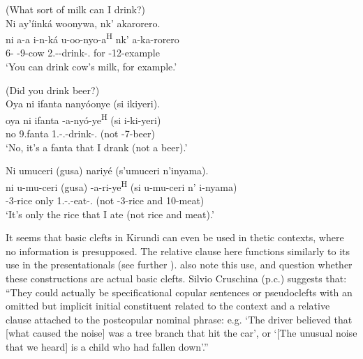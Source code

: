 \documentclass[output=paper]{langscibook}
\begin{document}
\z

\ea
\label{bkm:Ref79134504}
(What sort of milk can I drink?)\\
Ni ay’íinká woonywa, nk’ akarorero.\\
\gll
ni  a-a  i-n-ká  u-oo-nyo-a\textsuperscript{H}  nk’  a-ka-rorero\\
\COP{}  6-\CONN{}  \AUG{}-9-cow  2\SG.\SM-\POT-{}drink-\FV.\REL{}  for  \AUG{}-12-example\\
\glt
‘You can drink cow’s milk, for example.’\\

\z

\ea
\label{bkm:Ref79134487}
(Did you drink beer?)\\
Oya ni ifanta nanyóonye (si ikiyeri).\\
\gll
oya  ni  ifanta  \N{}-a-nyó-ye\textsuperscript{H}  (si  i-ki-yeri)\\
no  \COP{}  9.fanta  1\SG.\SM-\N.\PST-{}drink-\PFV.\REL{}  (not  \AUG{}-7-beer)\\
\glt
‘No, it’s a fanta that I drank (not a beer).’\\

\z

\ea
\label{bkm:Ref79134496}
Ni umuceri (gusa) nariyé (s’umuceri n’inyama).\\
\gll
ni  u-mu-ceri  (gusa)  \N{}-a-ri-ye\textsuperscript{H}  (si  u-mu-ceri  n’  i-nyama)\\
\COP{}  \AUG{}-3-rice  only  1\SG.\SM-\N.\PST{}-eat-\PFV.\REL{}  (not  \AUG-{}3-rice  and  10-meat)\\
\glt
‘It’s only the rice that I ate (not rice and meat).’\\

\z

It seems that basic clefts in Kirundi can even be used in thetic contexts, where no information is presupposed. The relative clause here functions similarly to its use in the presentationals (see further ). \citet[98]{LafkiouiEtAl2016} also note this use, and question whether these constructions are actual basic clefts. Silvio Cruschina (p.c.) suggests that: ``They could actually be specificational copular sentences or pseudoclefts with an omitted but implicit initial constituent related to the context and a relative clause attached to the postcopular nominal phrase: e.g. ‘The driver believed that [what caused the noise] was a tree branch that hit the car’, or ‘[The unusual noise that we heard] is a child who had fallen down’.''
\end{document}
